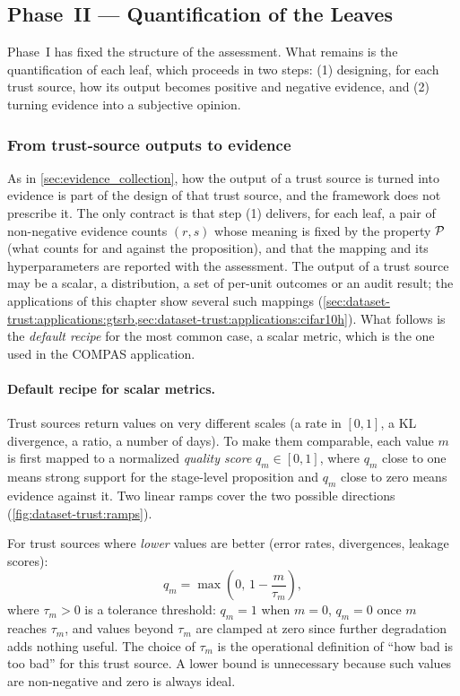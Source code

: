 \subsection{Phase~II --- Quantification of the Leaves}
\label{sec:dataset-trust:framework:phase2}
Phase~I has fixed the structure of the assessment. What remains is the quantification of each leaf, which proceeds in two steps: (1) designing, for each trust source, how its output becomes positive and negative evidence, and (2) turning evidence into a subjective opinion.

\subsubsection{From trust-source outputs to evidence}
\label{sec:dataset-trust:formal:evidence}
As in \cref{sec:evidence_collection}, how the output of a trust source is turned into evidence is part of the design of that trust source, and the framework does not prescribe it. The only contract is that step (1) delivers, for each leaf, a pair of non-negative evidence counts $(r, s)$ whose meaning is fixed by the property $\mathcal{P}$ (what counts for and against the proposition), and that the mapping and its hyperparameters are reported with the assessment. The output of a trust source may be a scalar, a distribution, a set of per-unit outcomes or an audit result; the applications of this chapter show several such mappings (\cref{sec:dataset-trust:applications:gtsrb,sec:dataset-trust:applications:cifar10h}). What follows is the \emph{default recipe} for the most common case, a scalar metric, which is the one used in the \ac{COMPAS} application.

\paragraph{Default recipe for scalar metrics.}
Trust sources return values on very different scales (a rate in $[0,1]$, a \ac{KL} divergence, a ratio, a number of days). To make them comparable, each value $m$ is first mapped to a normalized \emph{quality score} $q_m \in [0,1]$, where $q_m$ close to one means strong support for the stage-level proposition and $q_m$ close to zero means evidence against it. Two linear ramps cover the two possible directions (\cref{fig:dataset-trust:ramps}).

For trust sources where \emph{lower} values are better (error rates, divergences, leakage scores):
\begin{equation}
q_m = \max\!\left(0,\, 1 - \frac{m}{\tau_m}\right),
\label{eq:dataset-trust:q-low}
\end{equation}
where $\tau_m > 0$ is a tolerance threshold: $q_m = 1$ when $m = 0$, $q_m = 0$ once $m$ reaches $\tau_m$, and values beyond $\tau_m$ are clamped at zero since further degradation adds nothing useful. The choice of $\tau_m$ is the operational definition of ``how bad is too bad'' for this trust source. A lower bound is unnecessary because such values are non-negative and zero is always ideal.

